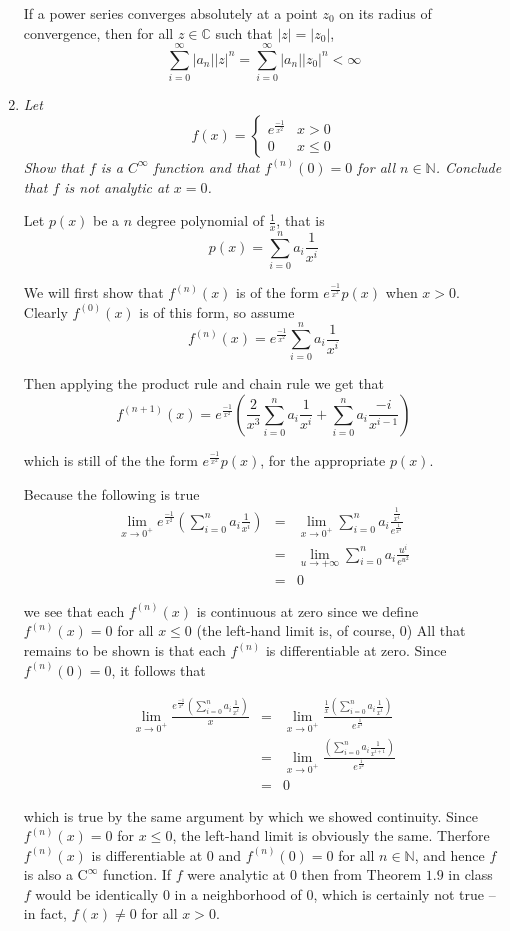 \documentclass[letterpaper, 11pt]{article}
\begin{document}
\begin{enumerate}
If a power series converges absolutely at a point $z_0$ on its radius of convergence, then for all $z \in \mathbb{C}$ such that $|z| = |z_0|$, 
\[
\sum_{i=0}^\infty |a_n| |z|^n = \sum_{i=0}^\infty |a_n| |z_0|^n < \infty
\]

\item \emph{Let $$f(x) = \begin{cases} e^{\frac{-1}{x^2}} & x > 0 \\ 0 & x \leq  0 \end{cases}$$  Show that $f$ is a $C^\infty$ function and that $f^{(n)}(0) = 0$ for all $n \in \mathbb{N}$.  Conclude that $f$ is not analytic at $x=0$.}

Let $p(x)$ be a $n$ degree polynomial of $\frac{1}{x}$, that is
\[
p(x) = \sum_{i=0}^n a_i\frac{1}{x^i}
\]

We will first show that $f^{(n)}(x)$ is of the form $e^{\frac{-1}{x^2}}p(x)$ when $x > 0$.  Clearly $f^{(0)}(x)$ is of this form, so assume 
\[
f^{(n)}(x) = e^{\frac{-1}{x^2}}\sum_{i=0}^n a_i\frac{1}{x^i}
\]

Then applying the product rule and chain rule we get that
\[
f^{(n+1)}(x) = e^{\frac{-1}{x^2}}\left(\frac{2}{x^3}\sum_{i=0}^n a_i\frac{1}{x^i} + \sum_{i=0}^n a_i\frac{-i}{x^{i-1}}\right)
\]

which is still of the the form $e^{\frac{-1}{x^2}}p(x)$, for the appropriate $p(x)$.

Because the following is true
\begin{eqnarray*}
\lim_{x \rightarrow 0^+} e^{\frac{-1}{x^2}} \left(\sum_{i=0}^n a_i \frac{1}{x^i} \right) &=& \lim_{x \rightarrow 0^+}\sum_{i=0}^n a_i \frac{\frac{1}{x^i}}{e^{\frac{1}{x^2}}} \\
&=& \lim_{u \rightarrow +\infty}\sum_{i=0}^n a_i \frac{u^i}{e^{u^2}} \\
&=& 0
\end{eqnarray*}

we see that each $f^{(n)}(x)$ is continuous at zero since we define $f^{(n)}(x) = 0$ for all $x \leq 0$ (the left-hand limit is, of course, $0$)  All that remains to be shown is that each $f^{(n)}$ is differentiable at zero.  Since $f^{(n)}(0) = 0$, it follows that 

\begin{eqnarray*}
\lim_{x \rightarrow 0^+} \frac{e^{\frac{-1}{x^2}} \left(\sum_{i=0}^n a_i \frac{1}{x^i} \right)}{x} &=& \lim_{x \rightarrow 0^+} \frac{\frac{1}{x}\left(\sum_{i=0}^n a_i \frac{1}{x^i} \right)}{e^\frac{1}{x^2}} \\
&=& \lim_{x \rightarrow 0^+} \frac{\left(\sum_{i=0}^n a_i \frac{1}{x^{i+1}} \right)}{e^\frac{1}{x^2}} \\
&=& 0
\end{eqnarray*}

which is true by the same argument by which we showed continuity. Since $f^{(n)}(x) = 0$ for $x \leq 0$, the left-hand limit is obviously the same.  Therfore $f^{(n)}(x)$ is differentiable at $0$ and $f^{(n)}(0) = 0$ for all $n \in \mathbb{N}$, and hence $f$ is also a $\text{C}^\infty$ function.  If $f$ were analytic at $0$ then from Theorem $1.9$ in class $f$ would be identically $0$ in a neighborhood of $0$, which is certainly not true -- in fact, $f(x) \neq 0$ for all $x > 0$.
\end{enumerate} 
\end{document}
